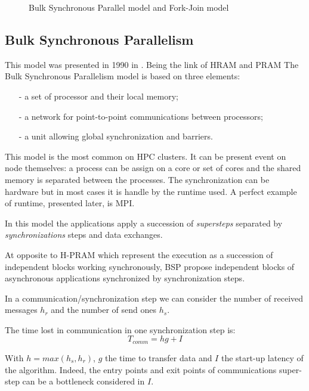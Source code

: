 \begin{figure}
\begin{center}

\end{center}
\caption{Bulk Synchronous Parallel model and Fork-Join model}
\label{fig:3_SOFT:bsp_fj}
\end{figure}

\subsection{Bulk Synchronous Parallelism }
This model was presented in 1990 in \cite{valiant1990bridging}.
Being the link of HRAM and PRAM 
The Bulk Synchronous Parallelism model is based on three elements:
\begin{itemize}[noitemsep,nolistsep]
  \item[-] a set of processor and their local memory;
  \item[-] a network for point-to-point communications between processors;
  \item[-] a unit allowing global synchronization and barriers.
\end{itemize}
This model is the most common on HPC clusters. 
It can be present event on node themselves: a process can be assign on a core or set of cores and the shared memory is separated between the processes. 
The synchronization can be hardware but in most cases it is handle by the runtime used.
A perfect example of runtime, presented later, is MPI. 

In this model the applications apply a succession of \textit{supersteps} separated by \textit{synchronizations} steps and data exchanges.

At opposite to H-PRAM which represent the execution as a succession of independent blocks working synchronously, BSP propose independent blocks of asynchronous applications synchronized by synchronization steps. 

In a communication/synchronization step we can consider the number of received messages $h_r$ and the number of send ones $h_s$.

The time lost in communication in one synchronization step is:
\begin{equation}
  T_{comm} = hg + I
\end{equation}

With $h = max(h_s,h_r)$, $g$ the time to transfer data and $I$ the start-up latency of the algorithm.
Indeed, the entry points and exit points of communications super-step can be a bottleneck considered in $I$.

